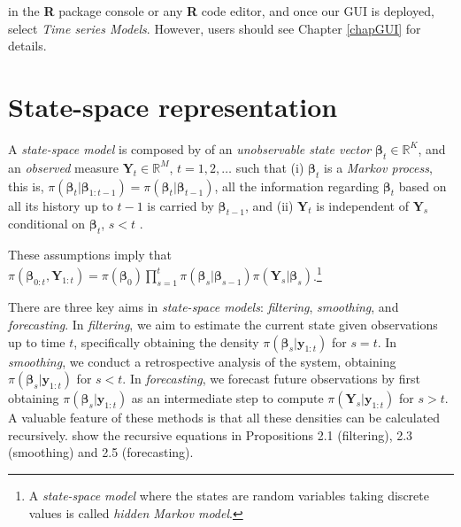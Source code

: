 in the \textbf{R} package console or any \textbf{R} code editor, and once our GUI is deployed, select \textit{Time series Models}. However, users should see Chapter \ref{chapGUI} for details.

\section{State-space representation}\label{sec81}
A \textit{state-space model} is composed by of an \textit{unobservable state vector}  $\bm{\beta}_t \in \mathbb{R}^K$, and an \textit{observed} measure $\bm{Y}_t \in \mathbb{R}^M$, $t=1,2,\dots$ such that (i) $\bm{\beta}_t$ is a \textit{Markov process}, this is, $\pi(\bm{\beta}_t|\bm{\beta}_{1:t-1})=\pi(\bm{\beta}_t|\bm{\beta}_{t-1})$, all the information regarding $\bm{\beta}_t$ based on all its history up to $t-1$ is carried by $\bm{\beta}_{t-1}$, and (ii) $\bm{Y}_t$ is independent of $\bm{Y}_s$ conditional on $\bm{\beta}_t$, $s < t$ \cite[Chap.~2]{petris2009dynamic}.

These assumptions imply that $\pi(\bm{\beta}_{0:t},\bm{Y}_{1:t})=\pi(\bm{\beta}_0)\prod_{s=1}^{t}\pi(\bm{\beta}_s|\bm{\beta}_{s-1})\pi(\bm{Y}_s|\bm{\beta}_s)$.\footnote{A \textit{state-space model} where the states are random variables taking discrete values is called \textit{hidden Markov model}.}

There are three key aims in \textit{state-space models}: \textit{filtering}, \textit{smoothing}, and \textit{forecasting}. In \textit{filtering}, we aim to estimate the current state given observations up to time $t$, specifically obtaining the density $\pi(\bm{\beta}_{s}|\bm{y}_{1:t})$ for $s = t$. In \textit{smoothing}, we conduct a retrospective analysis of the system, obtaining $\pi(\bm{\beta}_{s}|\bm{y}_{1:t})$ for $s < t$. In \textit{forecasting}, we forecast future observations by first obtaining $\pi(\bm{\beta}_{s}|\bm{y}_{1:t})$ as an intermediate step to compute $\pi(\bm{Y}_{s}|\bm{y}_{1:t})$ for $s > t$. A valuable feature of these methods is that all these densities can be calculated recursively. \cite{petris2009dynamic} show the recursive equations in Propositions 2.1 (filtering), 2.3 (smoothing) and 2.5 (forecasting).

